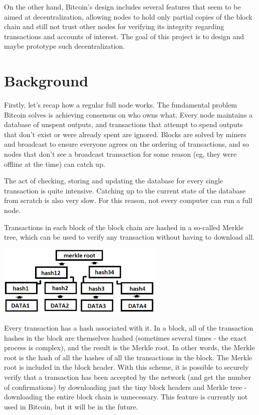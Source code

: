 \documentclass[a4paper,12pt]{article}
\begin{document}
On the other hand, Bitcoin's design includes several features that seem to be aimed at decentralization, allowing nodes to hold only partial copies of the block chain and still not trust other nodes for verifying its integrity regarding transactions and accounts of interest. The goal of this project is to design and maybe prototype such decentralization.

\newpage

\section{Background}

Firstly, let's recap how a regular full node works. The fundamental problem Bitcoin solves is achieving consensus on who owns what. Every node maintains a database of unspent outputs, and transactions that attempt to spend outputs that don't exist or were already spent are ignored. Blocks are solved by miners and broadcast to ensure everyone agrees on the ordering of transactions, and so nodes that don't see a broadcast transaction for some reason (eg, they were offline at the time) can catch up.

The act of checking, storing and updating the database for every single transaction is quite intensive. Catching up to the current state of the database from scratch is also very slow. For this reason, not every computer can run a full node.

Transactions in each block of the block chain are hashed in a so-called Merkle tree, which can be used to verify any transaction without having to download all. 

\begin{center}
\includegraphics[width=8cm]{mroot.jpg}
\end{center}

Every transaction has a hash associated with it. In a block, all of the transaction hashes in the block are themselves hashed (sometimes several times - the exact process is complex), and the result is the Merkle root. In other words, the Merkle root is the hash of all the hashes of all the transactions in the block. The Merkle root is included in the block header. With this scheme, it is possible to securely verify that a transaction has
been accepted by the network (and get the number of confirmations) by downloading just the tiny block headers and Merkle tree - downloading the entire block chain is unnecessary. This feature is currently not used in Bitcoin, but it will be in the future.
\end{document}
